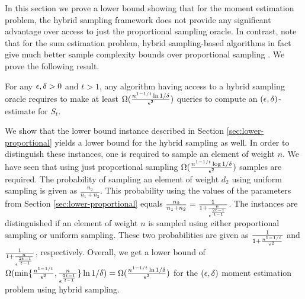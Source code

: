 In this section we prove a lower bound showing that for the moment estimation problem, the hybrid sampling framework does not provide any significant advantage over access to just the proportional sampling oracle. In contrast, note that for the sum estimation problem, hybrid sampling-based algorithms in fact give much better sample complexity bounds over proportional sampling \cite{MPX2007,BT2022}. We prove the following result.

\begin{thm} For any $\epsilon,\delta>0$ and $t>1$, any algorithm having access to a hybrid sampling oracle requires to make at least $\Omega(\frac{n^{1-1/t}\ln 1/\delta}{\epsilon^2})$ queries to compute an $(\epsilon,\delta)$-estimate for $S_t$. \end{thm}

We show that the lower bound instance described in Section \ref{sec:lower-proportional} yields a lower bound for the hybrid sampling as well. In order to distinguish these instances, one is required to sample an element of weight $n$. We have seen that using just proportional sampling $\Omega(\frac{n^{1-1/t} \log 1/\delta}{\epsilon^2})$ samples are required. The probability of sampling an element of weight $d_2$ using uniform sampling is given as $\frac{n_2}{n_1+n_2}$. This probability using the values of the parameters from Section \ref{sec:lower-proportional} equals $\frac{n_2}{n_1+n_2} = \frac{1}{1+\frac{n}{\epsilon^{\frac{2t-1}{t-1}}}}$. The instances are distinguished if an element of weight $n$ is sampled using either proportional sampling or uniform sampling. These two probabilities are given as $\frac{1}{1+\frac{n^{1-1/t}}{\epsilon^2}}$ and $\frac{1}{1+\frac{n}{\epsilon^{\frac{2t-1}{t-1}}}}$, respectively. Overall, we get a lower bound of $\Omega(\min\{\frac{n^{1-1/t}}{\epsilon^2}, \frac{n}{\epsilon^{\frac{2t-1}{t-1}}}\}\ln 1/\delta)=\Omega(\frac{n^{1-1/t}\ln 1/\delta}{\epsilon^2})$ for the $(\epsilon,\delta)$ moment estimation problem using hybrid sampling.
